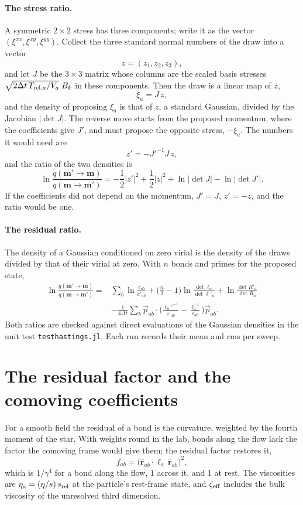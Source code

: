 \documentclass[11pt,aps,preprint,nofootinbib,superscriptaddress,tightenlines]{revtex4-2}
\def\st{\begin{equation}}
\def\stp{\end{equation}}
\let\oldparagraph\paragraph
\renewcommand{\paragraph}{\par\bigskip\oldparagraph}
\begin{document}
\paragraph{The stress ratio.}  A symmetric $2\times2$ stress has three components; write it as the vector $(\xi^{xx},\xi^{xy},\xi^{yy})$.  Collect the three standard
normal numbers of the draw into a vector
\st
z=(z_1,z_2,z_3),
\stp
and let $J$ be the $3\times3$ matrix whose columns are the scaled basis stresses $\sqrt{2\Delta t\,T_{{\rm rel},a}/V_a}\;B_k$ in these components.  Then
the draw is a linear map of $z$,
\st
\xi_a=J\,z ,
\stp
and the density of proposing $\xi_a$ is that of $z$, a standard Gaussian, divided by the Jacobian $|\det J|$.  The reverse move starts from the
proposed momentum, where the coefficients give $J'$, and must propose the opposite stress, $-\xi_a$.  The numbers it would need are
\st
z'=-J'^{-1}J\,z ,
\stp
and the ratio of the two densities is
\st
\ln\frac{q(\bm m'\to\bm m)}{q(\bm m\to\bm m')}=-\frac12|z'|^2+\frac12|z|^2+\ln|\det J|-\ln|\det J'| .
\stp
If the coefficients did not depend on the momentum, $J'=J$, $z'=-z$, and the ratio would be one.

\paragraph{The residual ratio.}  The density of a Gaussian conditioned on zero virial is the density of the draws divided by that of their
virial at zero.  With $n$ bonds and primes for the proposed state,
\st
\begin{aligned}
\ln\frac{q(\bm m'\to\bm m)}{q(\bm m\to\bm m')}={}&\sum_b\ln\frac{c_{ab}}{c'_{ab}}+\Big(\frac n2-1\Big)\ln\frac{\det\ell_a}{\det\ell'_a}+\ln\frac{\det R'_a}{\det R_a}\\
&-\frac1{4\Delta t}\sum_b\vec p_{ab}\cdot\Big(\frac{\ell_a'^{-1}}{c'_{ab}}-\frac{\ell_a^{-1}}{c_{ab}}\Big)\vec p_{ab} .
\end{aligned}
\stp
Both ratios are checked against direct evaluations of the Gaussian densities in the unit test \texttt{testhastings.jl}.  Each run
records their mean and rms per sweep.

\section{The residual factor and the comoving coefficients}
\label{app:residual}

For a smooth field the residual of a bond is the curvature, weighted by the fourth moment of the star.  With weights round in the lab, bonds
along the flow lack the factor the comoving frame would give them; the residual factor restores it,
\st
f_{ab}=\big(\hat{\bm r}_{ab}\cdot\ell_a\,\hat{\bm r}_{ab}\big)^2 ,
\stp
which is $1/\gamma^4$ for a bond along the flow, $1$ across it, and $1$ at rest.  The viscosities are $\eta_a=(\eta/s)\,s_{\rm rel}$ at the particle's
rest-frame state, and $\zeta_{\rm eff}$ includes the bulk viscosity of the unresolved third dimension.
\end{document}
